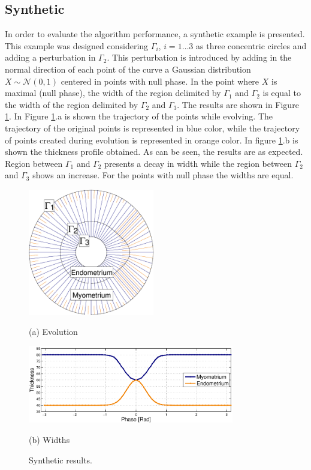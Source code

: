 \documentclass{article}
\begin{document}
\subsection{Synthetic}
\label{ssec:syn}
In order to evaluate the algorithm performance, a synthetic example is presented. This example was designed considering $\Gamma_i$, $i=1\dots3$ as three concentric circles and adding a perturbation in $\Gamma_2$. This perturbation is introduced by adding in the normal direction of each point of the curve a Gaussian distribution $X \sim \mathcal{N}(0,1)$ centered in points with null phase. In the point where $X$ is maximal (null phase), the width of the region delimited by $\Gamma_1$ and $\Gamma_2$ is equal to the width of the region delimited by $\Gamma_2$ and $\Gamma_3$. The results are shown in Figure \ref{fig:synth}. In Figure \ref{fig:synth}.a is shown the trajectory of the points while evolving. The trajectory of the original points is represented in blue color, while the trajectory of points created during evolution is represented in orange color. In figure \ref{fig:synth}.b is shown the thickness profile obtained. As can be seen, the results are as expected. Region between $\Gamma_1$ and $\Gamma_2$ presents a decay in width while the region between $\Gamma_2$ and $\Gamma_3$ shows an increase. For the points with null phase the widths are equal.
\begin{figure}[t]
\begin{minipage}[b]{1\linewidth}
  \centering
  \centerline{\includegraphics[width=5.5cm]{pics/synth}}
  \centerline{(a) Evolution}\medskip
\end{minipage}
\begin{minipage}[b]{1\linewidth}
  \centering
  \centerline{\includegraphics[width=9cm]{pics/synthWidth}}
  \centerline{(b) Widths}\medskip
\end{minipage}
\caption{Synthetic results.}
\label{fig:synth}
\end{figure}
\end{document}
